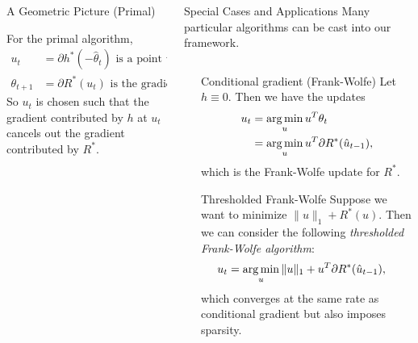 \documentclass[final]{beamer}
\begin{document}
\begin{frame}{}
\begin{columns}
\begin{column}{0.46\linewidth}
\begin{columns}[t]
\begin{column}{.53\linewidth}
\begin{block}{\large A Geometric Picture (Primal)}
\begin{center}
\end{center}
For the primal algorithm,
\begin{align*}
u_t\,\,\,\,\,\, &= \partial h^{*}(-\hat\theta_{t}) \text{ is a point where $-\hat\theta_{t} \in \partial h$} \\ 
\theta_{t+1}    &= \partial R^{*}(u_{t}) \text{ is the gradient of $R^{*}$ at $u_{t}$}
\end{align*}
So $u_{t}$ is chosen such that the gradient contributed by $h$ at $u_{t}$ cancels out the gradient contributed by $R^{*}$. 
\end{block}
\end{column}
\end{columns}
\end{column}	

	

\begin{column}{0.50\linewidth}

\begin{block}{\large Special Cases and Applications}
Many particular algorithms can be cast into our framework.\
\vspace{-4 mm}
\begin{columns}[t]
\begin{column}{0.01\linewidth}\end{column}
\begin{column}{0.47\linewidth}

\begin{block}{Conditional gradient (Frank-Wolfe)}
Let $h \equiv 0$. Then we have the updates
\begin{align*}
u_t &= \argmin_u u^T\theta_t \\
 &= \argmin_u u^T\partial R^*(\hat{u}_{t-1}),
\end{align*}
which is the Frank-Wolfe update for $R^*$.
\end{block}

\begin{block}{Thresholded Frank-Wolfe}
Suppose we want to minimize $\|u\|_1 + R^*(u)$. Then 
we can consider the following 
\emph{thresholded Frank-Wolfe algorithm}:
\begin{align*}
u_t &= \argmin_u \|u\|_1 + u^T\partial R^*(\hat{u}_{t-1}),
\end{align*}
which converges at the same rate as conditional gradient 
but also imposes sparsity.
\end{block}


\end{column}
\end{columns}
\end{block}
\end{column}
\end{columns}
\end{frame}
\end{document}

